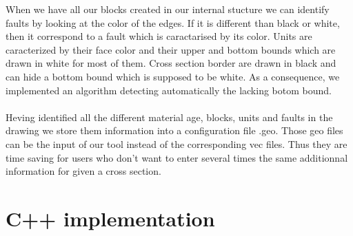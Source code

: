 \documentclass[12pt, a4paper]{report} %
\begin{document}
When we have all our blocks created in our internal stucture we can identify faults by looking at the color of the edges. If it is different than black or white, then it correspond to a fault which is caractarised by its color. Units are caracterized by their face color and their upper and bottom bounds which are drawn in white for most of them. Cross section border are drawn in black and can hide a bottom bound which is supposed to be white. As a consequence, we implemented an algorithm  detecting automatically the lacking botom bound.\\\\

Heving identified all the different material age, blocks, units and faults in the drawing we store them information into a configuration file .geo. Those geo files can be the input of our tool instead of the corresponding vec files. Thus they  are time saving for users who don't want to enter several times the same additionnal information for  given a cross section.

\section{C++ implementation}  
  
\end{document}
